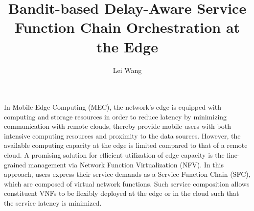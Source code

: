 \documentclass[12pt]{ucalgthes1}
\title{Bandit-based Delay-Aware Service Function Chain
	Orchestration at the Edge \\ \bigskip
 }
\author{Lei Wang}
\newcommand{\thesistitle}{Title of Thesis}
\begin{document}
\makethesistitle
{}     %
\setcounter{page}{2}

%
%

%
\newpage
{}
{}
In Mobile Edge Computing (MEC), the network’s edge is equipped with computing and storage resources in order to reduce latency by minimizing communication with remote
clouds, thereby provide mobile users with both intensive computing resources and proximity to the data sources. However, the available computing capacity at the edge is limited compared to that of a remote cloud. A promising solution for efficient utilization of edge capacity is the fine-grained management via Network Function Virtualization (NFV). In this approach, users express their service demands as a Service Function Chain (SFC), which are composed
of virtual network functions. Such service composition allows
constituent VNFs to be flexibly deployed at the edge or in the
cloud such that the service latency is minimized.
\end{document}
